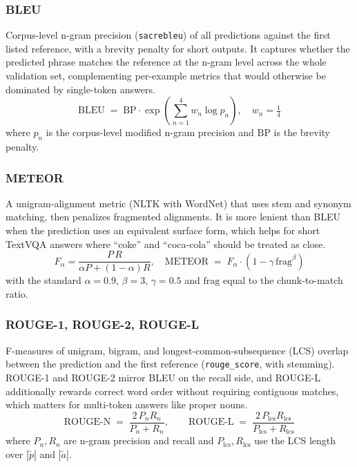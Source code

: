 \documentclass[11pt]{article}
\begin{document}
\subsubsection{BLEU}

Corpus-level n-gram precision (\texttt{sacrebleu}) of all predictions against the first listed reference, with a brevity penalty for short outputs. It captures whether the predicted phrase matches the reference at the n-gram level across the whole validation set, complementing per-example metrics that would otherwise be dominated by single-token answers.
\[
\mathrm{BLEU} \;=\; \mathrm{BP} \cdot \exp\!\left(\sum_{n=1}^{4} w_n \log p_n\right),\quad w_n = \tfrac{1}{4}
\]
where $p_n$ is the corpus-level modified n-gram precision and $\mathrm{BP}$ is the brevity penalty.

\subsubsection{METEOR}

A unigram-alignment metric (NLTK with WordNet) that uses stem and synonym matching, then penalizes fragmented alignments. It is more lenient than BLEU when the prediction uses an equivalent surface form, which helps for short TextVQA answers where ``coke'' and ``coca-cola'' should be treated as close.
\[
F_\alpha = \frac{P\,R}{\alpha P + (1-\alpha) R},\quad
\mathrm{METEOR} \;=\; F_\alpha \cdot \left(1 - \gamma\, \mathrm{frag}^{\beta}\right)
\]
with the standard $\alpha{=}0.9$, $\beta{=}3$, $\gamma{=}0.5$ and $\mathrm{frag}$ equal to the chunk-to-match ratio.

\subsubsection{ROUGE-1, ROUGE-2, ROUGE-L}

F-measures of unigram, bigram, and longest-common-subsequence (LCS) overlap between the prediction and the first reference (\texttt{rouge\_score}, with stemming). ROUGE-1 and ROUGE-2 mirror BLEU on the recall side, and ROUGE-L additionally rewards correct word order without requiring contiguous matches, which matters for multi-token answers like proper nouns.
\[
\mathrm{ROUGE\text{-}N} \;=\; \frac{2\, P_n R_n}{P_n + R_n},\qquad
\mathrm{ROUGE\text{-}L} \;=\; \frac{2\, P_{\mathrm{lcs}} R_{\mathrm{lcs}}}{P_{\mathrm{lcs}} + R_{\mathrm{lcs}}}
\]
where $P_n, R_n$ are n-gram precision and recall and $P_{\mathrm{lcs}}, R_{\mathrm{lcs}}$ use the LCS length over $|\tilde{p}|$ and $|\tilde{a}|$.
\end{document}
